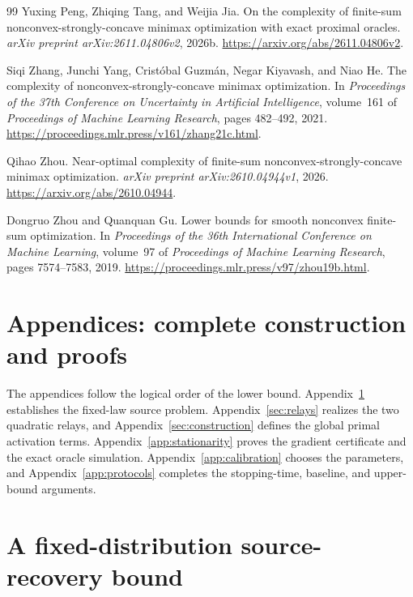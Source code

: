 \documentclass[11pt,letterpaper]{article}
\theoremstyle{definition}
\theoremstyle{remark}
\begin{document}
\begin{thebibliography}{99}
Yuxing Peng, Zhiqing Tang, and Weijia Jia.
\newblock On the complexity of finite-sum nonconvex-strongly-concave minimax optimization with exact proximal oracles.
\newblock \emph{arXiv preprint arXiv:2611.04806v2}, 2026b.
\newblock \url{https://arxiv.org/abs/2611.04806v2}.

Siqi Zhang, Junchi Yang, Crist\'obal Guzm\'an, Negar Kiyavash, and Niao He.
\newblock The complexity of nonconvex-strongly-concave minimax optimization.
\newblock In \emph{Proceedings of the 37th Conference on Uncertainty in Artificial Intelligence}, volume~161 of \emph{Proceedings of Machine Learning Research}, pages 482--492, 2021.
\newblock \url{https://proceedings.mlr.press/v161/zhang21c.html}.

Qihao Zhou.
\newblock Near-optimal complexity of finite-sum nonconvex-strongly-concave minimax optimization.
\newblock \emph{arXiv preprint arXiv:2610.04944v1}, 2026.
\newblock \url{https://arxiv.org/abs/2610.04944}.

Dongruo Zhou and Quanquan Gu.
\newblock Lower bounds for smooth nonconvex finite-sum optimization.
\newblock In \emph{Proceedings of the 36th International Conference on Machine Learning}, volume~97 of \emph{Proceedings of Machine Learning Research}, pages 7574--7583, 2019.
\newblock \url{https://proceedings.mlr.press/v97/zhou19b.html}.
\end{thebibliography}

\clearpage
\appendix
\section*{Appendices: complete construction and proofs}
The appendices follow the logical order of the lower bound.
Appendix~\ref{app:source} establishes the fixed-law source problem.
Appendix~\ref{sec:relays} realizes the two quadratic relays, and
Appendix~\ref{sec:construction} defines the global primal activation terms.
Appendix~\ref{app:stationarity} proves the gradient certificate and the
exact oracle simulation. Appendix~\ref{app:calibration} chooses the
parameters, and Appendix~\ref{app:protocols} completes the stopping-time,
baseline, and upper-bound arguments.

\section{A fixed-distribution source-recovery bound}
\label{app:source}
\end{document}
